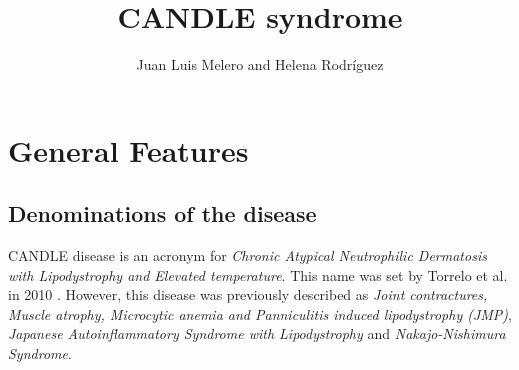 \documentclass[a4paper,10pt]{report}
\title{CANDLE syndrome}
\author{Juan Luis Melero and Helena Rodríguez}
\begin{document}
\maketitle
\tableofcontents

\begin{abstract}
\end{abstract}

\chapter{General Features}

\section{Denominations of the disease}

CANDLE disease is an acronym for \textit{Chronic Atypical Neutrophilic Dermatosis with Lipodystrophy and Elevated temperature}. This name was set by Torrelo et al. in 2010 \cite{Torrelo2010}.
However, this disease was previously described as \textit{Joint contractures, Muscle atrophy, Microcytic anemia and Panniculitis induced lipodystrophy (JMP)}, \textit{Japanese Autoinflammatory Syndrome with Lipodystrophy} and \textit{Nakajo-Nishimura Syndrome}.
\end{document}
